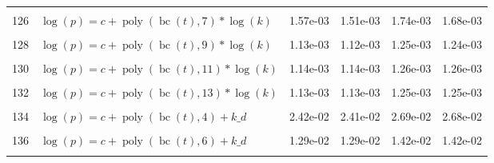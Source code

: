 \documentclass[12pt,a4paper]{article}
\DeclareMathOperator{\bc}{bc}
\DeclareMathOperator{\poly}{poly}
\begin{document}
\begin{longtable}[t]{ll>{\raggedleft\arraybackslash}p{2cm}>{\raggedleft\arraybackslash}p{2cm}>{\raggedleft\arraybackslash}p{2cm}>{\raggedleft\arraybackslash}p{2cm}}
\cellcolor{gray!6}{125} & \cellcolor{gray!6}{$\log(p) = c + \poly\left( \bc(t), 6 \right) * \log(k)$} & \cellcolor{gray!6}{1.28e-03} & \cellcolor{gray!6}{1.23e-03} & \cellcolor{gray!6}{1.42e-03} & \cellcolor{gray!6}{1.37e-03}\\
126 & $\log(p) = c + \poly\left( \bc(t), 7 \right) * \log(k)$ & 1.57e-03 & 1.51e-03 & 1.74e-03 & 1.68e-03\\
\cellcolor{gray!6}{127} & \cellcolor{gray!6}{$\log(p) = c + \poly\left( \bc(t), 8 \right) * \log(k)$} & \cellcolor{gray!6}{1.26e-03} & \cellcolor{gray!6}{1.20e-03} & \cellcolor{gray!6}{1.40e-03} & \cellcolor{gray!6}{1.33e-03}\\
128 & $\log(p) = c + \poly\left( \bc(t), 9 \right) * \log(k)$ & 1.13e-03 & 1.12e-03 & 1.25e-03 & 1.24e-03\\
\cellcolor{gray!6}{129} & \cellcolor{gray!6}{$\log(p) = c + \poly\left( \bc(t), 10 \right) * \log(k)$} & \cellcolor{gray!6}{1.13e-03} & \cellcolor{gray!6}{1.12e-03} & \cellcolor{gray!6}{1.25e-03} & \cellcolor{gray!6}{1.24e-03}\\
130 & $\log(p) = c + \poly\left( \bc(t), 11 \right) * \log(k)$ & 1.14e-03 & 1.14e-03 & 1.26e-03 & 1.26e-03\\
\cellcolor{gray!6}{131} & \cellcolor{gray!6}{$\log(p) = c + \poly\left( \bc(t), 12 \right) * \log(k)$} & \cellcolor{gray!6}{1.13e-03} & \cellcolor{gray!6}{1.13e-03} & \cellcolor{gray!6}{1.25e-03} & \cellcolor{gray!6}{1.25e-03}\\
132 & $\log(p) = c + \poly\left( \bc(t), 13 \right) * \log(k)$ & 1.13e-03 & 1.13e-03 & 1.25e-03 & 1.25e-03\\
\cellcolor{gray!6}{133} & \cellcolor{gray!6}{$\log(p) = c + \poly\left( \bc(t), 3 \right) + k\_d$} & \cellcolor{gray!6}{3.64e-02} & \cellcolor{gray!6}{2.04e-02} & \cellcolor{gray!6}{4.05e-02} & \cellcolor{gray!6}{2.26e-02}\\
134 & $\log(p) = c + \poly\left( \bc(t), 4 \right) + k\_d$ & 2.42e-02 & 2.41e-02 & 2.69e-02 & 2.68e-02\\
\cellcolor{gray!6}{135} & \cellcolor{gray!6}{$\log(p) = c + \poly\left( \bc(t), 5 \right) + k\_d$} & \cellcolor{gray!6}{1.59e-02} & \cellcolor{gray!6}{1.40e-02} & \cellcolor{gray!6}{1.77e-02} & \cellcolor{gray!6}{1.55e-02}\\
136 & $\log(p) = c + \poly\left( \bc(t), 6 \right) + k\_d$ & 1.29e-02 & 1.29e-02 & 1.42e-02 & 1.42e-02\\
\cellcolor{gray!6}{137} & \cellcolor{gray!6}{$\log(p) = c + \poly\left( \bc(t), 7 \right) + k\_d$} & \cellcolor{gray!6}{1.30e-02} & \cellcolor{gray!6}{1.30e-02} & \cellcolor{gray!6}{1.44e-02} & \cellcolor{gray!6}{1.43e-02}\\

\end{longtable}
\end{document}
